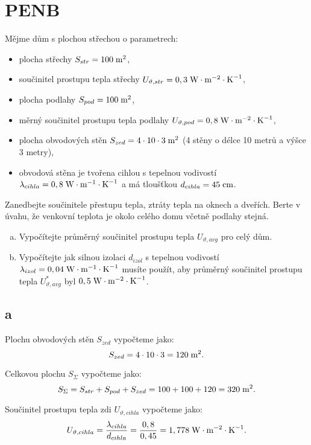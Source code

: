 \documentclass{article}
\begin{document}
\section{ PENB \spicy \spicy}
Mějme dům s plochou střechou o parametrech:
\begin{itemize}
    \item plocha střechy $S_{str} = 100 \; \textrm{m}^{\textrm{2}}$,
    \item součinitel prostupu tepla střechy $U_{\vartheta,str} = 0,3 \; \textrm{W} \cdot \textrm{m}^{-2} \cdot \textrm{K}^{-1}$,
    \item plocha podlahy $S_{pod} = 100 \; \textrm{m}^{\textrm{2}}$,
    \item měrný součinitel prostupu tepla podlahy $U_{\vartheta,pod} = 0,8 \; \textrm{W} \cdot \textrm{m}^{-2} \cdot \textrm{K}^{-1}$,
    \item plocha obvodových stěn $S_{zed} = 4 \cdot 10 \cdot 3 \; \textrm{m}^{\textrm{2}}$ (4 stěny o délce 10 metrů a výšce 3 metry),
    \item obvodová stěna je tvořena cihlou s tepelnou vodivostí $\lambda_{cihla} = 0,8 \; \textrm{W} \cdot \textrm{m}^{-1} \cdot \textrm{K}^{-1}$ a má tloušťkou $d_{cihla} = 45 \; \textrm{cm}$.
\end{itemize}

Zanedbejte součinitele přestupu tepla, ztráty tepla na oknech a dveřích. Berte v úvahu, že venkovní teplota je okolo celého domu včetně podlahy stejná.
\begin{enumerate}[a)]
    \item Vypočítejte průměrný součinitel prostupu tepla $U_{\vartheta,avg}$ pro celý dům.
    \item Vypočítejte jak silnou izolaci $d_{izol}$ s tepelnou vodivostí $\lambda_{izol} = 0,04 \; \textrm{W} \cdot \textrm{m}^{-1} \cdot \textrm{K}^{-1}$ musíte použít, aby průměrný součinitel prostupu tepla $U_{\vartheta,avg}^{*}$ byl $0,5 \; \textrm{W} \cdot \textrm{m}^{-2} \cdot \textrm{K}^{-1}$.
\end{enumerate}



\subsection{a}
Plochu obvodových stěn $S_{zed}$ vypočteme jako:
$$
    S_{zed} = 4 \cdot 10 \cdot 3 = 120 \; \textrm{m}^{\textrm{2}}.
$$

Celkovou plochu $S_{\Sigma}$ vypočteme jako:
$$
    S_{\Sigma} = S_{str} + S_{pod} + S_{zed} = 100 + 100 + 120 = 320 \; \textrm{m}^{\textrm{2}}.
$$

Součinitel prostupu tepla zdi $U_{\vartheta,cihla}$ vypočteme jako:
$$
    U_{\vartheta,cihla} = \frac{\lambda_{cihla}}{d_{cihla}} = \frac{0,8}{0,45} = 1,778 \; \textrm{W} \cdot \textrm{m}^{-2} \cdot \textrm{K}^{-1}.
$$
\end{document}
